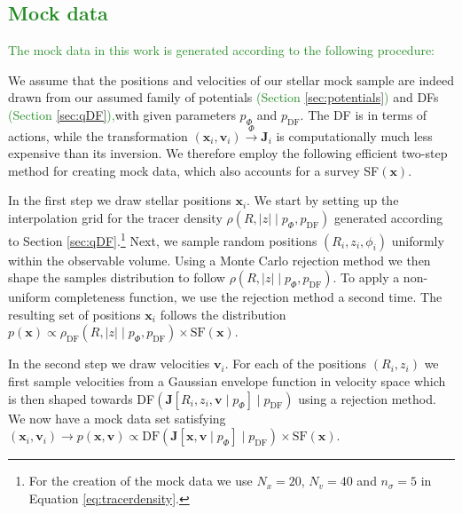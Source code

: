 \documentclass[iop,revtex4]{emulateapj}
\newcommand{\vect}[1]{\boldsymbol{#1}}
\newcommand{\NEW}[1]{\textcolor{ForestGreen}{#1}}
\newcommand{\OLD}[1]{}
\begin{document}
\begin{appendix}
\subsection{\NEW{Mock data}} \label{app:mockdata}

\OLD{We will rely on mock data as input to explore the limitations of the modelling.}\NEW{The mock data in this work is generated according to the following procedure:} 

We assume that the positions and velocities of our stellar mock sample are indeed drawn from our assumed family of potentials \NEW{(Section \ref{sec:potentials})} and DFs \NEW{(Section \ref{sec:qDF}),}\OLD{(}with given parameters $p_\Phi$ and $p_\text{DF}$\OLD{)}. The DF is in terms of actions, while the transformation $(\vect{x}_i,\vect{v}_i) \stackrel{\Phi}{\longrightarrow} \vect{J}_i$ is computationally much less expensive than its inversion. We therefore employ the following efficient two-step method for creating mock data, which also accounts for a survey SF$(\vect{x})$.

In the first step we draw stellar positions $\vect{x}_i$. We start by setting up the interpolation grid for the tracer density $\rho(R,|z| \mid p_\Phi, p_\text{DF})$ generated according to Section \ref{sec:qDF}.\footnote{For the creation of the mock data we use $N_x = 20$, $N_v = 40$ and $n_\sigma=5$ in Equation \eqref{eq:tracerdensity}.} Next, we sample random positions $(R_i,z_i,\phi_i)$ uniformly within the observable volume. Using a Monte Carlo rejection method we then shape the samples distribution to follow $\rho(R,|z| \mid p_\Phi, p_\text{DF})$. To apply a non-uniform completeness function, we use the rejection method a second time. The resulting set of positions $\vect{x}_i$ follows the distribution $p(\vect{x}) \propto \rho_\text{DF}(R,|z| \mid p_{\Phi},p_\text{DF}) \times \text{SF}(\vect{x})$.

In the second step we draw velocities $\vect{v}_i$. For each of the positions $(R_i,z_i)$ we first sample velocities from a Gaussian envelope function in velocity space which is then shaped towards DF$(\vect{J}[R_i,z_i,\vect{v} \mid p_{\Phi}] \mid p_\text{DF})$ using a rejection method. We now have a mock data set satisfying $(\vect{x}_i,\vect{v}_i) \longrightarrow p(\vect{x},\vect{v}) \propto \text{DF}(\vect{J}[\vect{x},\vect{v} \mid p_{\Phi}] \mid p_\text{DF}) \times \text{SF}(\vect{x})$.


\end{appendix}
\end{document}
